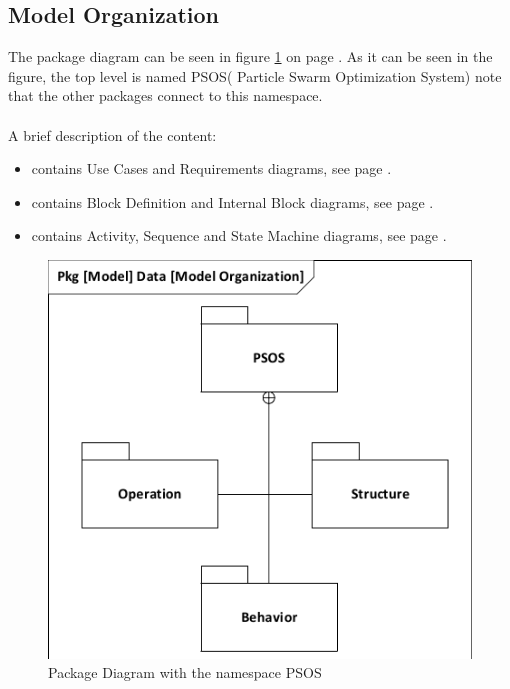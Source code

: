 \subsection{Model Organization}
The package diagram can be seen in figure \ref{fig:pkg} on page \pageref{fig:pkg}. As it can be seen in the figure, the top level is named PSOS( Particle Swarm Optimization System) note that the other packages connect to this namespace.
\\\\
A brief description of the content:
\begin{itemize}
	\item {} contains Use Cases and Requirements diagrams, see page \pageref{requirementspecification:operation}.
	\item {} contains Block Definition and Internal Block diagrams, see page \pageref{requirementspecification:Structure}.
	\item {} contains Activity, Sequence and State Machine diagrams, see page \pageref{requirementspecification:Behavior}.

\end{itemize}

\begin{figure}[H]
	\centering
	\includegraphics[width=0.7\linewidth]{diagram/pkg_data_model_organization.pdf}
	\caption{Package Diagram with the namespace PSOS}
	\label{fig:pkg}
\end{figure}